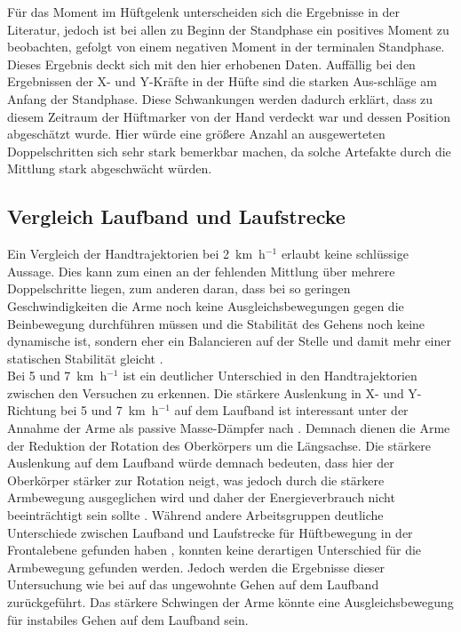 Für das Moment im Hüftgelenk unterscheiden sich die Ergebnisse in der Literatur, jedoch ist bei allen zu Beginn der Standphase ein positives Moment zu beobachten, gefolgt von einem negativen Moment in der terminalen Standphase. Dieses Ergebnis deckt sich mit den hier erhobenen Daten. Auffällig bei den Ergebnissen der X- und Y-Kräfte in der Hüfte sind die starken Aus-schläge am Anfang der Standphase. Diese Schwankungen werden dadurch erklärt, dass zu diesem Zeitraum der Hüftmarker von der Hand verdeckt war und dessen Position abgeschätzt wurde. Hier würde eine größere Anzahl an ausgewerteten Doppelschritten sich sehr stark bemerkbar machen, da solche Artefakte durch die Mittlung stark abgeschwächt würden.


\subsection{Vergleich Laufband und Laufstrecke}
Ein Vergleich der Handtrajektorien bei 2~km~h$^{-1}$ erlaubt keine schlüssige Aussage. Dies kann zum einen an der fehlenden Mittlung über mehrere Doppelschritte liegen, zum anderen daran, dass bei so geringen Geschwindigkeiten die Arme noch keine Ausgleichsbewegungen gegen die Beinbewegung durchführen müssen und die Stabilität des Gehens noch keine dynamische ist, sondern eher ein Balancieren auf der Stelle und damit mehr einer statischen Stabilität gleicht \parencite{barbareschi2015statically}.\\
Bei 5 und 7~km~h$^{-1}$ ist ein deutlicher Unterschied in den Handtrajektorien zwischen den Versuchen zu erkennen. Die stärkere Auslenkung in X- und Y-Richtung bei 5 und 7~km~h$^{-1}$ auf dem Laufband ist interessant unter der Annahme der Arme als passive Masse-Dämpfer nach \textcite{pontzer2009control}. Demnach dienen die Arme der Reduktion der Rotation des Oberkörpers um die Längsachse. Die stärkere Auslenkung auf dem Laufband würde demnach bedeuten, dass hier der Oberkörper stärker zur Rotation neigt, was jedoch durch die stärkere Armbewegung ausgeglichen wird und daher der Energieverbrauch nicht beeinträchtigt sein sollte \parencite{pontzer2009control}. Während andere Arbeitsgruppen deutliche Unterschiede zwischen Laufband und Laufstrecke für Hüftbewegung in der Frontalebene gefunden haben \parencite{alton1998kinematic}, konnten keine derartigen Unterschied für die Armbewegung gefunden werden. Jedoch werden die Ergebnisse dieser Untersuchung wie bei \textcite{alton1998kinematic} auf das ungewohnte Gehen auf dem Laufband zurückgeführt. Das stärkere Schwingen der Arme könnte eine Ausgleichsbewegung für instabiles Gehen auf dem Laufband sein.\\
